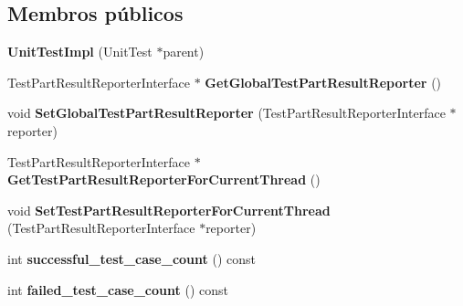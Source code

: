 \subsection*{Membros públicos}
\begin{DoxyCompactItemize}
\item 
\hypertarget{classtesting_1_1internal_1_1UnitTestImpl_a5fb75faa88ee71f26e16473455b70839}{{\bfseries Unit\-Test\-Impl} (Unit\-Test $\ast$parent)}\label{classtesting_1_1internal_1_1UnitTestImpl_a5fb75faa88ee71f26e16473455b70839}

\item 
\hypertarget{classtesting_1_1internal_1_1UnitTestImpl_a1cd291fd6751654924362164735d4b49}{Test\-Part\-Result\-Reporter\-Interface $\ast$ {\bfseries Get\-Global\-Test\-Part\-Result\-Reporter} ()}\label{classtesting_1_1internal_1_1UnitTestImpl_a1cd291fd6751654924362164735d4b49}

\item 
\hypertarget{classtesting_1_1internal_1_1UnitTestImpl_a892b0e25b28af5e4400cf6fac336f2d8}{void {\bfseries Set\-Global\-Test\-Part\-Result\-Reporter} (Test\-Part\-Result\-Reporter\-Interface $\ast$reporter)}\label{classtesting_1_1internal_1_1UnitTestImpl_a892b0e25b28af5e4400cf6fac336f2d8}

\item 
\hypertarget{classtesting_1_1internal_1_1UnitTestImpl_a5fb3dd8bc839e10b62eba07790704132}{Test\-Part\-Result\-Reporter\-Interface $\ast$ {\bfseries Get\-Test\-Part\-Result\-Reporter\-For\-Current\-Thread} ()}\label{classtesting_1_1internal_1_1UnitTestImpl_a5fb3dd8bc839e10b62eba07790704132}

\item 
\hypertarget{classtesting_1_1internal_1_1UnitTestImpl_a1403fc10aebcc64479c5ee980c9b4eb4}{void {\bfseries Set\-Test\-Part\-Result\-Reporter\-For\-Current\-Thread} (Test\-Part\-Result\-Reporter\-Interface $\ast$reporter)}\label{classtesting_1_1internal_1_1UnitTestImpl_a1403fc10aebcc64479c5ee980c9b4eb4}

\item 
\hypertarget{classtesting_1_1internal_1_1UnitTestImpl_a549c383b4d21bfd4b60d3d6aa2ac1949}{int {\bfseries successful\-\_\-test\-\_\-case\-\_\-count} () const }\label{classtesting_1_1internal_1_1UnitTestImpl_a549c383b4d21bfd4b60d3d6aa2ac1949}

\item 
\hypertarget{classtesting_1_1internal_1_1UnitTestImpl_a09dd83b48ef2082fab162e8792eaa295}{int {\bfseries failed\-\_\-test\-\_\-case\-\_\-count} () const }\label{classtesting_1_1internal_1_1UnitTestImpl_a09dd83b48ef2082fab162e8792eaa295}


\end{DoxyCompactItemize}
